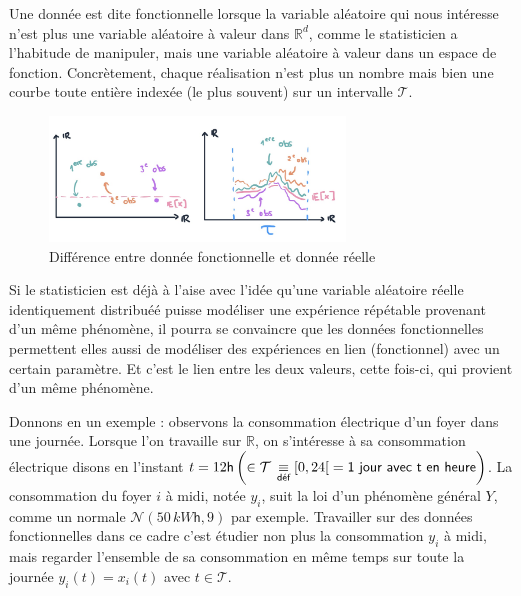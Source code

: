 
Une donnée est dite fonctionnelle lorsque la variable aléatoire qui nous intéresse n'est plus une variable aléatoire à valeur dans $\mathds R^d$, comme le statisticien a l'habitude de manipuler, mais une variable aléatoire à valeur dans un espace de fonction. Concrètement, chaque réalisation n'est plus un nombre mais bien une courbe toute entière indexée (le plus souvent) sur un intervalle $\mathcal T$. 

\begin{figure}[H]
    \centering
    \includegraphics[width=0.7\textwidth]{Images/motivation/donneesRvsFD.jpg}
    \caption{Différence entre donnée fonctionnelle et donnée réelle}
    \label{img:RvsFD}
\end{figure}

Si le statisticien est déjà à l'aise avec l'idée qu'une variable aléatoire réelle identiquement distribuéé puisse modéliser une expérience répétable provenant d'un même phénomène, il pourra se convaincre que les données fonctionnelles permettent elles aussi de modéliser des expériences en lien (fonctionnel) avec un certain paramètre. Et c'est le lien entre les deux valeurs, cette fois-ci, qui provient d'un même phénomène. 

\largeskip

Donnons en un exemple : observons la consommation électrique d'un foyer dans une journée. Lorsque l'on travaille sur $\mathds R$, on s'intéresse à sa consommation électrique disons en l'instant $t = 12\mathsf{h} \left(\in \mathcal T \, \isdef [0,24[ \; = \textsf{1 jour avec t en heure}\right)$. La consommation du foyer $i$ à midi, notée $y_i$, suit la loi d'un phénomène général $Y$, comme un normale $\mathcal N\left( 50 \, kW\mathsf h, 9\right)$ par exemple. Travailler sur des données fonctionnelles dans ce cadre c'est étudier non plus la consommation $y_i$ à midi, mais regarder l'ensemble de sa consommation en même temps sur toute la journée $y_i(t) = x_i(t)$ avec $t \in \mathcal T$. 


